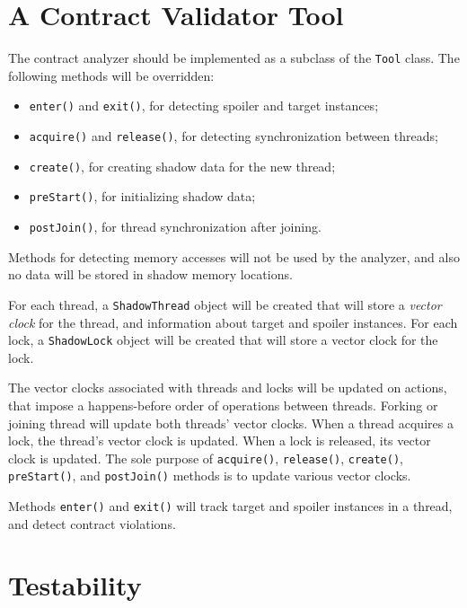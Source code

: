 \section{A Contract Validator Tool}

The contract analyzer should be implemented as a subclass of the \texttt{Tool}
class. The following methods will be overridden:
\begin{itemize}
    \item \texttt{enter()} and \texttt{exit()}, for detecting spoiler and target
        instances;
    \item \texttt{acquire()} and \texttt{release()}, for detecting
        synchronization between threads;
    \item \texttt{create()}, for creating shadow data for the new thread;
    \item \texttt{preStart()}, for initializing shadow data;
    \item \texttt{postJoin()}, for thread synchronization after joining.
\end{itemize}

Methods for detecting memory accesses will not be used by the analyzer, and also
no data will be stored in shadow memory locations.

For each thread, a \texttt{ShadowThread} object will be created that will store
a \emph{vector clock} for the thread, and information about target and spoiler
instances. For each lock, a \texttt{ShadowLock} object will be created that will
store a vector clock for the lock.

The vector clocks associated with threads and locks will be updated on actions,
that impose a happens-before order of operations between threads. Forking or
joining thread will update both threads' vector clocks. When a thread acquires a
lock, the thread's vector clock is updated. When a lock is released, its vector
clock is updated. The sole purpose of \texttt{acquire()}, \texttt{release()},
\texttt{create()}, \texttt{preStart()}, and \texttt{postJoin()} methods is to
update various vector clocks.

Methods \texttt{enter()} and \texttt{exit()} will track target and spoiler
instances in a thread, and detect contract violations.


\section{Testability}

